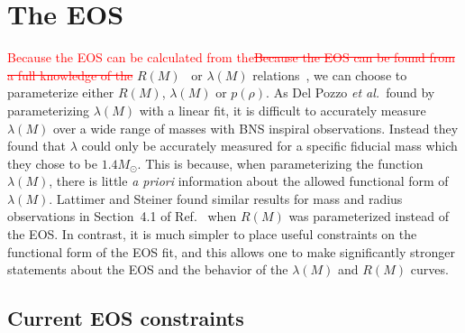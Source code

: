\documentclass[twocolumn,prd,amssymb,aps,nofootinbib,showpacs,epsf]{revtex4}
\newcommand\ben[2]{\textcolor{red}{{#1}\sout{#2}}}
\newcommand\les[2]{\textcolor{blue}{{#1}\sout{#2}}}
\begin{document}


\section{The EOS}
\label{sec:eos}

\ben{Because the EOS can be calculated from the}{Because the EOS can be found from a full knowledge of the} $R(M)$~\cite{Lindblom1992} or $\lambda(M)$ relations~\cite{LindblomIndik2012, LindblomIndik2014}, we can choose to parameterize either $R(M)$, $\lambda(M)$ or $p(\rho)$. As Del Pozzo {\it et al.}\ found by parameterizing $\lambda(M)$ with a linear fit, it is difficult to accurately measure $\lambda(M)$ over a wide range of masses with BNS inspiral observations. Instead they found that $\lambda$ could only be accurately measured for a specific fiducial mass which they chose to be $1.4M_\odot$. This is because, when parameterizing the function $\lambda(M)$, there is little {\it a priori} information about the allowed functional form of $\lambda(M)$. Lattimer and Steiner found similar results for mass and radius observations in Section~4.1 of Ref.~\cite{LattimerSteiner2014} when $R(M)$ was parameterized instead of the EOS. In contrast, it is much simpler to place useful constraints on the functional form of the EOS fit, and this allows one to make significantly stronger statements about the EOS and the behavior of the $\lambda(M)$ and $R(M)$ curves.

\subsection{Current EOS constraints}
\label{sec:eosconstraints}
\end{document}
